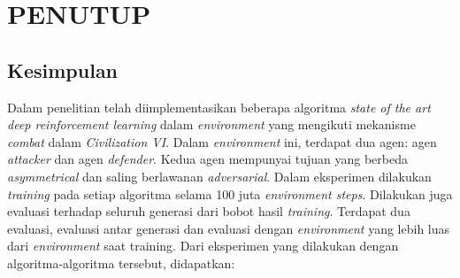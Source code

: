 \chapter{PENUTUP}
\label{chap:penutup}


\section{Kesimpulan}
\label{sec:kesimpulan}

Dalam penelitian telah diimplementasikan beberapa algoritma \emph{state of the art} \emph{deep reinforcement learning} dalam \emph{environment}
yang mengikuti mekanisme \emph{combat} dalam \emph{Civilization VI}.
Dalam \emph{environment} ini, terdapat dua agen: agen \emph{attacker} dan agen \emph{defender}.
Kedua agen mempunyai tujuan yang berbeda \emph{asymmetrical} dan saling berlawanan \emph{adversarial}.
Dalam eksperimen dilakukan \emph{training} pada setiap algoritma selama 100 juta \emph{environment steps}.
Dilakukan juga evaluasi terhadap seluruh generasi dari bobot hasil \emph{training}.
Terdapat dua evaluasi, evaluasi antar generasi dan evaluasi dengan \emph{environment} yang lebih luas dari \emph{environment} saat training.
Dari eksperimen yang dilakukan dengan algoritma-algoritma tersebut, didapatkan:

